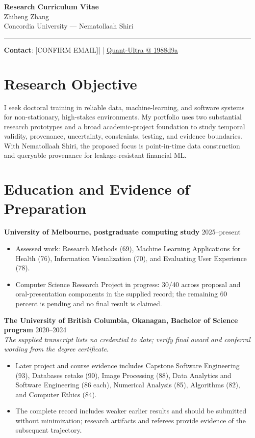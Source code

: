 \documentclass[11pt]{article}
\makeatletter
\newcommand{\ApplicantName}{Zhiheng Zhang}
\newcommand{\ApplicantEmail}{[CONFIRM EMAIL]}
\newcommand{\ApplicantPhone}{[CONFIRM PHONE]}
\newcommand{\ApplicantGitHub}{\href{https://github.com/zhiheng-zhang-Mera/Quant-Ultra/tree/1988d9a8530da91a8158de864d098ea869098923}{Quant-Ultra @ 1988d9a}}
\makeatother
\begin{document}
\begin{center}
{\LARGE\bfseries Research Curriculum Vitae}\\[0.25em]
{\large \ApplicantName}\\
Concordia University --- Nematollaah Shiri
\end{center}
\vspace{0.35em}\hrule\vspace{0.65em}

\textbf{Contact}: \ApplicantEmail\quad | \quad \ApplicantPhone\quad | \quad \ApplicantGitHub

\section*{Research Objective}
I seek doctoral training in reliable data, machine-learning, and software systems for non-stationary, high-stakes environments. My portfolio uses two substantial research prototypes and a broad academic-project foundation to study temporal validity, provenance, uncertainty, constraints, testing, and evidence boundaries. With Nematollaah Shiri, the proposed focus is point-in-time data construction and queryable provenance for leakage-resistant financial ML.

\section*{Education and Evidence of Preparation}
\textbf{University of Melbourne, postgraduate computing study} \hfill 2025--present
\begin{itemize}
\item Assessed work: Research Methods (69), Machine Learning Applications for Health (76), Information Visualization (70), and Evaluating User Experience (78).
\item Computer Science Research Project in progress: 30/40 across proposal and oral-presentation components in the supplied record; the remaining 60 percent is pending and no final result is claimed.
\end{itemize}

\textbf{The University of British Columbia, Okanagan, Bachelor of Science program} \hfill 2020--2024\\
\textit{The supplied transcript lists no credential to date; verify final award and conferral wording from the degree certificate.}
\begin{itemize}
\item Later project and course evidence includes Capstone Software Engineering (93), Databases retake (90), Image Processing (88), Data Analytics and Software Engineering (86 each), Numerical Analysis (85), Algorithms (82), and Computer Ethics (84).
\item The complete record includes weaker earlier results and should be submitted without minimization; research artifacts and referees provide evidence of the subsequent trajectory.
\end{itemize}
\end{document}
